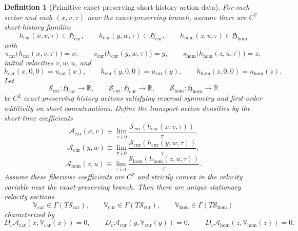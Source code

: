 \documentclass[11pt]{article}
\newcommand{\TensorStateManifold}{\mathcal S_{\mathrm{car}}}
\newcommand{\CurStateManifold}{\mathcal S_{\mathrm{cur}}}
\newcommand{\HomStateManifold}{\mathcal S_{\mathrm{hom}}}
\newcommand{\TensorTransport}{\mathbb V_{\mathrm{car}}}
\newcommand{\CurTransport}{\mathbb V_{\mathrm{cur}}}
\newcommand{\HomTransport}{\mathbb V_{\mathrm{hom}}}
\newcommand{\TensorActionDensity}{\mathscr A_{\mathrm{car}}}
\newcommand{\CurActionDensity}{\mathscr A_{\mathrm{cur}}}
\newcommand{\HomActionDensity}{\mathscr A_{\mathrm{hom}}}
\newcommand{\TensorHistoryClass}{\mathfrak H_{\mathrm{car}}}
\newcommand{\CurHistoryClass}{\mathfrak H_{\mathrm{cur}}}
\newcommand{\HomHistoryClass}{\mathfrak H_{\mathrm{hom}}}
\newcommand{\TensorHistoryAction}{\mathscr S_{\mathrm{car}}}
\newcommand{\CurHistoryAction}{\mathscr S_{\mathrm{cur}}}
\newcommand{\HomHistoryAction}{\mathscr S_{\mathrm{hom}}}
\newtheorem{definition}{Definition}
\begin{document}
\begin{definition}[Primitive exact-preserving short-history action data]
For each sector and each \((x,v,\tau)\) near the exact-preserving branch, assume there are \(C^2\) short-history families
\[
h_{\mathrm{car}}(x,v,\tau)\in\TensorHistoryClass,\qquad
h_{\mathrm{cur}}(y,w,\tau)\in\CurHistoryClass,\qquad
h_{\mathrm{hom}}(z,u,\tau)\in\HomHistoryClass
\]
with
\[
s_{\mathrm{car}}\bigl(h_{\mathrm{car}}(x,v,\tau)\bigr)=x,\qquad
s_{\mathrm{cur}}\bigl(h_{\mathrm{cur}}(y,w,\tau)\bigr)=y,\qquad
s_{\mathrm{hom}}\bigl(h_{\mathrm{hom}}(z,u,\tau)\bigr)=z,
\]
initial velocities \(v,w,u\), and
\[
h_{\mathrm{car}}(x,0,0)=u_{\mathrm{car}}(x),\qquad
h_{\mathrm{cur}}(y,0,0)=u_{\mathrm{cur}}(y),\qquad
h_{\mathrm{hom}}(z,0,0)=u_{\mathrm{hom}}(z).
\]
Let
\[
\TensorHistoryAction:\TensorHistoryClass\to\mathbb R,\qquad
\CurHistoryAction:\CurHistoryClass\to\mathbb R,\qquad
\HomHistoryAction:\HomHistoryClass\to\mathbb R
\]
be \(C^2\) exact-preserving history actions satisfying reversal symmetry and first-order additivity on short concatenations. Define the transport-action densities by the short-time coefficients
\begin{equation}
\TensorActionDensity(x,v)
\equiv
\lim_{\tau\downarrow 0}
\frac{\TensorHistoryAction(h_{\mathrm{car}}(x,v,\tau))}{\tau},
\label{eq:history_transport_action_car}
\end{equation}
\begin{equation}
\CurActionDensity(y,w)
\equiv
\lim_{\tau\downarrow 0}
\frac{\CurHistoryAction(h_{\mathrm{cur}}(y,w,\tau))}{\tau},
\label{eq:history_transport_action_cur}
\end{equation}
\begin{equation}
\HomActionDensity(z,u)
\equiv
\lim_{\tau\downarrow 0}
\frac{\HomHistoryAction(h_{\mathrm{hom}}(z,u,\tau))}{\tau}.
\label{eq:history_transport_action_hom}
\end{equation}
Assume these fiberwise coefficients are \(C^2\) and strictly convex in the velocity variable near the exact-preserving branch. Then there are unique stationary velocity sections
\[
\TensorTransport\in\Gamma(T\TensorStateManifold),\qquad
\CurTransport\in\Gamma(T\CurStateManifold),\qquad
\HomTransport\in\Gamma(T\HomStateManifold)
\]
characterized by
\begin{equation}
D_v\TensorActionDensity(x,\TensorTransport(x))=0,\qquad
D_v\CurActionDensity(y,\CurTransport(y))=0,\qquad
D_v\HomActionDensity(z,\HomTransport(z))=0.
\label{eq:history_stationary_transport}
\end{equation}


\end{definition}
\end{document}
